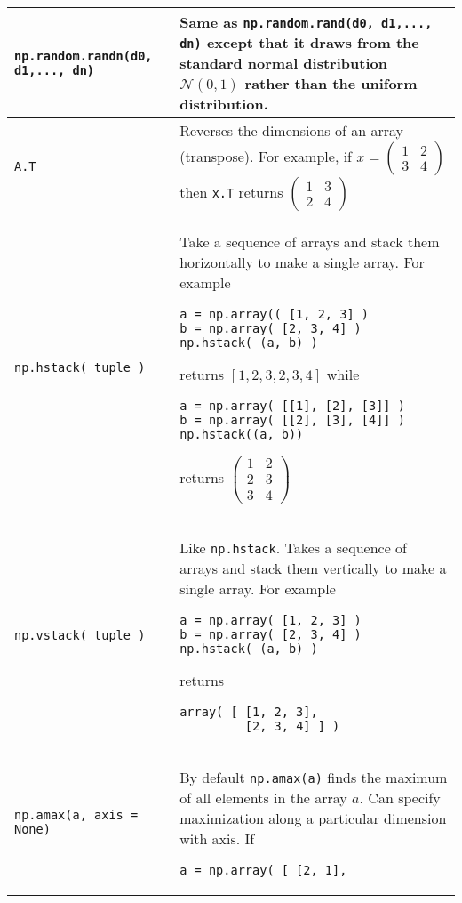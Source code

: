\documentclass[]{article}
\begin{document}
\begin{longtable}{ | m{6cm}  | m{11cm} |}
	\\\hline
	\texttt{np.random.randn(d0, d1,..., dn)} & Same as {\texttt{np.random.rand(d0, d1,..., dn)} } except that it draws from the standard normal distribution $\mathcal N(0, 1)$ rather than the uniform distribution.
	\\\hline
	\texttt{A.T} & Reverses the dimensions of an array (transpose).  For example, if $x = \left(\begin{matrix} 1& 2\\3&4\end{matrix}\right)$ then \texttt{x.T} returns $\left(\begin{matrix} 1& 3\\2&4\end{matrix}\right)$
	\\\hline
	\texttt{np.hstack( tuple )} & Take a sequence of arrays and stack them horizontally to make a single array.  For example 
	\begin{verbatim}
a = np.array(( [1, 2, 3] )
b = np.array( [2, 3, 4] )
np.hstack( (a, b) )
	\end{verbatim}
    returns $[1, 2, 3, 2, 3, 4]$ while 
	\begin{verbatim}
a = np.array( [[1], [2], [3]] )
b = np.array( [[2], [3], [4]] )
np.hstack((a, b))
	\end{verbatim} 
    returns $\left( \begin{matrix} 1&2\\2&3\\ 3&4 \end{matrix}\right)$
	\\\hline
	\texttt{np.vstack( tuple )} & Like \texttt{np.hstack}.  Takes a sequence of arrays and stack them vertically to make a single array.  For example 
	\begin{verbatim}
a = np.array( [1, 2, 3] )
b = np.array( [2, 3, 4] )
np.hstack( (a, b) )
	\end{verbatim}
    returns 
	\begin{verbatim}
array( [ [1, 2, 3], 
         [2, 3, 4] ] )
	\end{verbatim}
	\\\hline
	\texttt{np.amax(a, axis = None)} & By default {\texttt{np.amax(a)} } finds the maximum of all elements in the array $a$.  Can specify maximization along a particular dimension with axis.  If 
	\begin{verbatim}
a = np.array( [ [2, 1], 

\end{verbatim}
\end{longtable}
\end{document}
